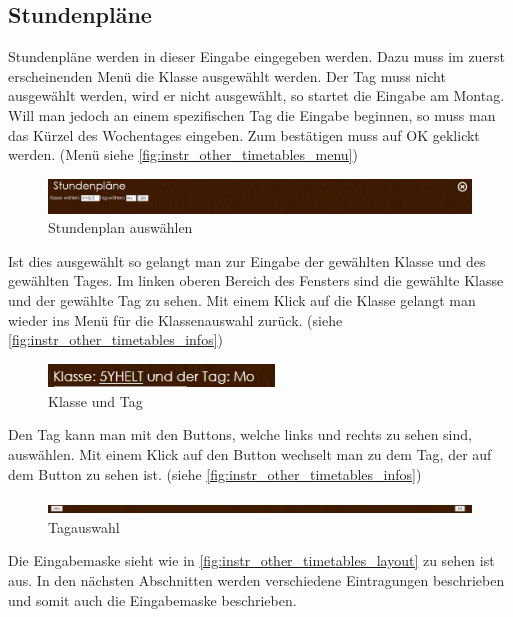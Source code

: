 \subsection{Stundenpläne}
Stundenpläne werden in dieser Eingabe eingegeben werden. Dazu muss im zuerst erscheinenden Menü die Klasse ausgewählt werden. Der Tag muss nicht ausgewählt werden, wird er nicht ausgewählt, so startet die Eingabe am Montag. Will man jedoch an einem spezifischen Tag die Eingabe beginnen, so muss man das Kürzel des Wochentages eingeben. Zum bestätigen muss auf OK geklickt werden. (Menü siehe \autoref{fig:instr_other_timetables_menu})
\begin{figure}[H]
\centering
\includegraphics[keepaspectratio=true, width=17cm]{images/screenshots/timetables_input_menu.png}
\caption{Stundenplan auswählen}
\label{fig:instr_other_timetables_menu}
\end{figure}
Ist dies ausgewählt so gelangt man zur Eingabe der gewählten Klasse und des gewählten Tages. Im linken oberen Bereich des Fensters sind die gewählte Klasse und der gewählte Tag zu sehen. Mit einem Klick auf die Klasse gelangt man wieder ins Menü für die Klassenauswahl zurück. (siehe \autoref{fig:instr_other_timetables_infos})
\begin{figure}[H]
\centering
\includegraphics[keepaspectratio=true, width=6cm]{images/screenshots/timetables_input_infos.png}
\caption{Klasse und Tag}
\label{fig:instr_other_timetables_infos}
\end{figure}
Den Tag kann man mit den Buttons, welche links und rechts zu sehen sind, auswählen.  Mit einem Klick auf den Button wechselt man zu dem Tag, der auf dem Button zu sehen ist. (siehe \autoref{fig:instr_other_timetables_infos})
\begin{figure}[H]
\centering
\includegraphics[keepaspectratio=true, width=17cm]{images/screenshots/timetables_input_day.png}
\caption{Tagauswahl}
\label{fig:instr_other_timetables_infos}
\end{figure}
Die Eingabemaske sieht wie in \autoref{fig:instr_other_timetables_layout} zu sehen ist aus. In den nächsten Abschnitten werden verschiedene Eintragungen beschrieben und somit auch die Eingabemaske beschrieben.
